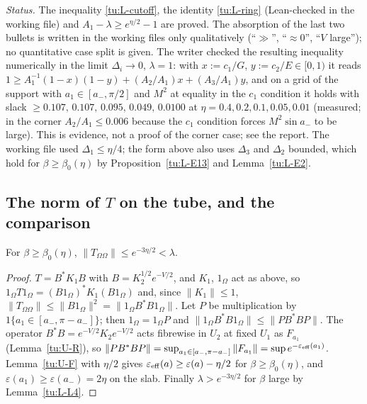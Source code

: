\noindent\emph{Status.} The inequality \eqref{tu:L-cutoff}, the identity \eqref{tu:L-ring} (Lean-checked in the
working file) and $A_1-\lambda\ge e^{\eta/2}-1$ are proved. The absorption of the last two bullets is written in the
working files only qualitatively (``$\gg$'', ``$\approx0$'', ``$V$ large''); no quantitative case split is given.
The writer checked the resulting inequality numerically in the limit $\Delta_i\to0$, $\lambda=1$: with $x:=c_1/G$,
$y:=c_2/E\in[0,1)$ it reads $1\ge A_1^{-1}(1-x)(1-y)+(A_2/A_1)x+(A_3/A_1)y$, and on a grid of the support with
$a_1\in[a_-,\pi/2]$ and $M^2$ at equality in the $c_1$ condition it holds with slack $\ge0.107,\,0.107,\,0.095,\,0.049,\,0.0100$
at $\eta=0.4,0.2,0.1,0.05,0.01$ (measured; in the corner $A_2/A_1\le0.006$ because the $c_1$ condition forces
$M^2\sin a_-$ to be large). This is evidence, not a proof of the corner case; see the report.
The working file used $\Delta_1\le\eta/4$; the form above also uses $\Delta_3$ and $\Delta_2$ bounded, which hold for
$\beta\ge\beta_0(\eta)$ by Proposition~\ref{tu:L-E13} and Lemma~\ref{tu:L-E2}.

\subsection{The norm of $T$ on the tube, and the comparison}

\begin{lemma}\label{tu:L-norm}
For $\beta\ge\beta_0(\eta)$, $\|T_{\Omega\Omega}\|\le e^{-3\eta/2}<\lambda$.
\end{lemma}

\begin{proof}
$T=B^*K_1B$ with $B=K_2^{1/2}e^{-V/2}$, and $K_1$, $1_\Omega$ act as above, so
$1_\Omega T1_\Omega=(B1_\Omega)^*K_1(B1_\Omega)$ and, since $\|K_1\|\le1$,
$\|T_{\Omega\Omega}\|\le\|B1_\Omega\|^2=\|1_\Omega B^*B1_\Omega\|$. Let $P$ be multiplication by
$1\{a_1\in[a_-,\pi-a_-]\}$; then $1_\Omega=1_\Omega P$ and $\|1_\Omega B^*B1_\Omega\|\le\|PB^*BP\|$. The operator
$B^*B=e^{-V/2}K_2e^{-V/2}$ acts fibrewise in $U_2$ at fixed $U_1$ as $F_{a_1}$ (Lemma~\ref{tu:U-R}), so
$\|PB^*BP\|=\sup_{a_1\in[a_-,\pi-a_-]}\|F_{a_1}\|=\sup e^{-\varepsilon_{\rm eff}(a_1)}$. Lemma~\ref{tu:U-F} with $\eta/2$ gives
$\varepsilon_{\rm eff}(a)\ge\varepsilon(a)-\eta/2$ for $\beta\ge\beta_0(\eta)$, and $\varepsilon(a_1)\ge\varepsilon(a_-)=2\eta$ on the slab.
Finally $\lambda>e^{-3\eta/2}$ for $\beta$ large by Lemma~\ref{tu:L-L4}.
\end{proof}

